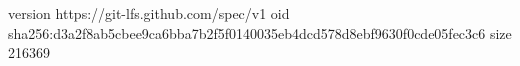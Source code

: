 version https://git-lfs.github.com/spec/v1
oid sha256:d3a2f8ab5cbee9ca6bba7b2f5f0140035eb4dcd578d8ebf9630f0cde05fec3c6
size 216369
